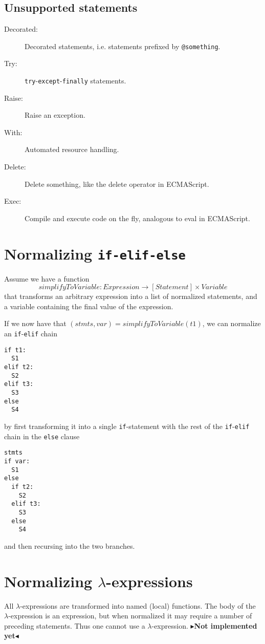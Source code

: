 \documentclass[11pt]{report}
\newcommand{\todo}[1]{{\color[rgb]{.5,0,0}\textbf{$\blacktriangleright$#1$\blacktriangleleft$}}}
\begin{document}
\subsection{Unsupported statements}
\begin{description}
  \item[Decorated:] Decorated statements, i.e. statements prefixed by
    \verb|@something|.
  \item[Try:] \verb|try|-\verb|except|-\verb|finally| statements.
  \item[Raise:] Raise an exception.
  \item[With:] Automated resource handling.
  \item[Delete:] Delete something, like the delete operator in
    ECMAScript.
  \item[Exec:] Compile and execute code on the fly, analogous to eval
    in ECMAScript.
\end{description}

\section{Normalizing {\tt if-elif-else}}
Assume we have a function $$simplifyToVariable: Expression \rightarrow
[Statement] \times Variable$$ that transforms an arbitrary expression
into a list of normalized statements, and a variable containing the
final value of the expression.

If we now have that $(stmts, var) = simplifyToVariable(t1)$, we can
normalize an \verb!if!-\verb!elif! chain
\begin{verbatim}
if t1:
  S1
elif t2:
  S2
elif t3:
  S3
else
  S4
\end{verbatim}
by first transforming it into a single \verb!if!-statement with the rest of the
\verb!if!-\verb!elif! chain in the \verb!else! clause
\begin{verbatim}
stmts
if var:
  S1
else
  if t2:
    S2
  elif t3:
    S3
  else
    S4
\end{verbatim}
and then recursing into the two branches.

\section{Normalizing $\lambda$-expressions}
All $\lambda$-expressions are transformed into named (local) functions. The body
of the $\lambda$-expression is an expression, but when normalized it may require
a number of preceding statements. Thus one cannot use a $\lambda$-expression.
\todo{Not implemented yet}
\end{document}
